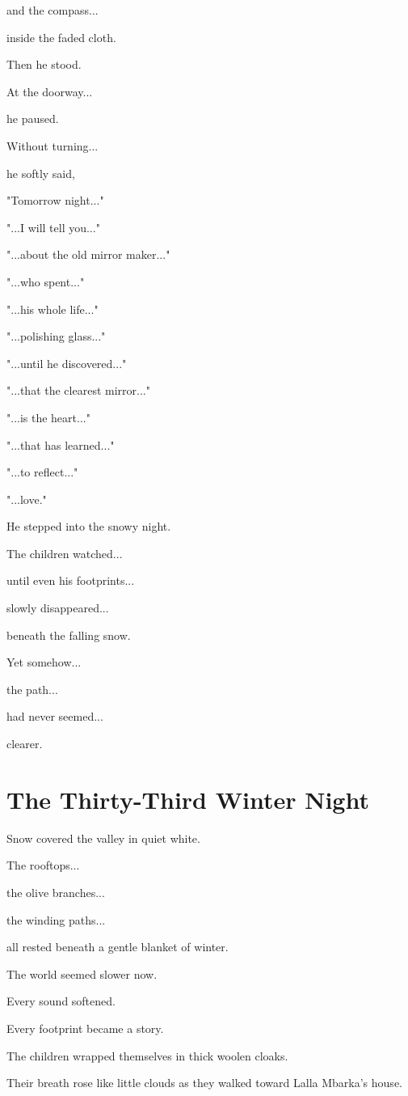 \documentclass[12pt,openany]{book}
\begin{document}
and the compass...

inside the faded cloth.

Then he stood.

At the doorway...

he paused.

Without turning...

he softly said,

"Tomorrow night..."

"...I will tell you..."

"...about the old mirror maker..."

"...who spent..."

"...his whole life..."

"...polishing glass..."

"...until he discovered..."

"...that the clearest mirror..."

"...is the heart..."

"...that has learned..."

"...to reflect..."

"...love."

He stepped into the snowy night.

The children watched...

until even his footprints...

slowly disappeared...

beneath the falling snow.

Yet somehow...

the path...

had never seemed...

clearer.
\chapter{The Thirty-Third Winter Night}

Snow covered the valley in quiet white.

The rooftops...

the olive branches...

the winding paths...

all rested beneath a gentle blanket of winter.

The world seemed slower now.

Every sound softened.

Every footprint became a story.

The children wrapped themselves in thick woolen cloaks.

Their breath rose like little clouds as they walked toward Lalla Mbarka's house.
\end{document}
